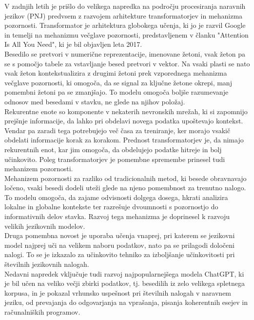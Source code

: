 \documentclass[a4paper,12pt,openright]{book}
\begin{document}
V zadnjih letih je prišlo do velikega napredka na področju procesiranja naravnih jezikov (PNJ) predvsem z razvojem arhitekture transformatorjev in mehanizma pozornosti.
Transformator je arhitektura globokega učenja, ki jo je razvil Google in temelji na mehanizmu večglave pozornosti, predstavljenem v članku "Attention Is All You Need", ki je bil objavljen leta 2017.  \cite{datacamp_attention_2024} \\
Besedilo se pretvori v numerične reprezentacije, imenovane žetoni, vsak žeton pa se s pomočjo tabele za vstavljanje besed pretvori v vektor. Na vsaki plasti se nato vsak žeton kontekstualizira z drugimi žetoni prek vzporednega mehanizma večglave pozornosti, ki omogoča, da se signal za ključne žetone okrepi, manj pomembni žetoni pa se zmanjšajo. To modelu omogoča boljše razumevanje odnosov med besedami v stavku, ne glede na njihov položaj. \\
Rekurentne enote so komponente v nekaterih nevronskih mrežah, ki si zapomnijo prejšnje informacije, da lahko pri obdelavi novega podatka upoštevajo kontekst. Vendar pa zaradi tega potrebujejo več časa za treniranje, ker morajo vsakič obdelati informacije korak za korakom.
Prednost transformatorjev je, da nimajo rekurentnih enot, kar jim omogoča, da obdelujejo podatke hitreje in bolj učinkovito. Poleg transformatorjev je pomembne spremembe prinesel tudi mehanizem pozornosti. \cite{NIPS2017_3f5ee243} \\
Mehanizem pozornosti za razliko od tradicionalnih metod, ki besede obravnavajo ločeno, vsaki besedi dodeli uteži glede na njeno pomembnost za trenutno nalogo. To modelu omogoča, da zajame odvisnosti dolgega dosega, hkrati analizira lokalne in globalne kontekste ter razrešuje dvoumnosti s pozornostjo do informativnih delov stavka. Razvoj tega mehanizma je doprinesel k razvoju velikih jezikovnih modelov. \cite{datacamp_attention_2024, KASNECI2023102274} \\
Druga pomembna novost je uporaba učenja vnaprej, pri katerem se jezikovni model najprej uči na velikem naboru podatkov, nato pa se prilagodi določeni nalogi. To se je izkazalo za učinkovito tehniko za izboljšanje učinkovitosti pri številnih jezikovnih nalogah. \\
Nedavni napredek vključuje tudi razvoj najpopularnejšega modela ChatGPT, ki je bil učen na veliko večji zbirki podatkov, tj. besedilih iz zelo velikega spletnega korpusa, in je pokazal vrhunsko uspešnost pri številnih nalogah v naravnem jeziku, od prevajanja do odgovarjanja na vprašanja, pisanja koherentnih esejev in računalniških programov. \cite{KASNECI2023102274} \\
\end{document}
